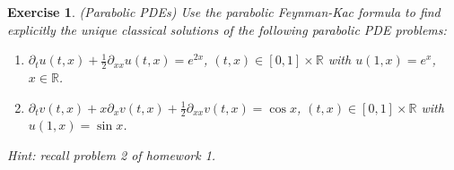 \documentclass[12pt]{article}
\theoremstyle{colon}
\newtheorem{exercise}{Exercise}
\begin{document}
\clearpage

\begin{exercise}
  (Parabolic PDEs) Use the parabolic Feynman-Kac formula to find \textit{explicitly} the unique classical solutions of the following parabolic PDE problems:
  \begin{enumerate}[label=\alph*)]
    \item $\partial_t u(t,x) + \frac{1}{2} \partial_{xx} u(t,x) = e^{2x}$, $(t,x) \in [0,1] \times \mathbb{R}$ with $u(1,x) = e^x$, $x \in \mathbb{R}$.
    \item $\partial_t v(t,x) + x \partial_x v(t,x) + \frac{1}{2} \partial_{xx} v(t,x) = \cos x$, $(t,x) \in [0,1] \times \mathbb{R}$ with $u(1,x) = \sin x$.
  \end{enumerate}

  \textit{Hint: recall problem 2 of homework 1.}
\end{exercise}
\end{document}
